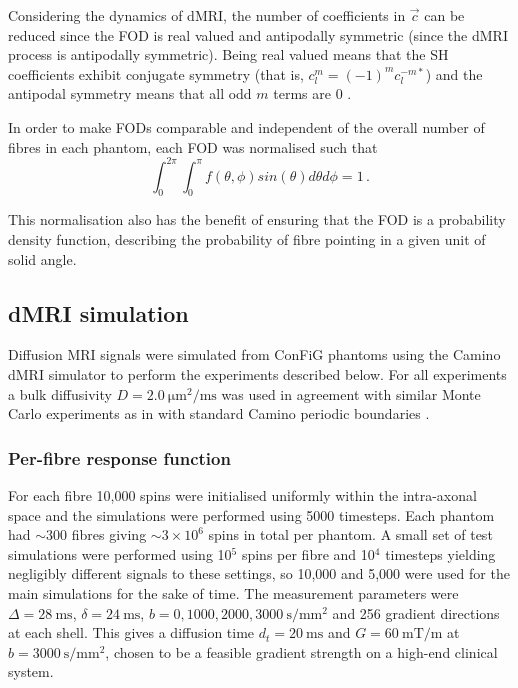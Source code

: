 Considering the dynamics of \ac{dMRI}, the number of coefficients in $\vec{c}$ can be reduced since the \ac{FOD} is real valued and antipodally symmetric (since the \ac{dMRI} process is antipodally symmetric).
Being real valued means that the \ac{SH} coefficients exhibit conjugate symmetry (that is, $c_l^m = (-1)^mc_l^{-m*}$) \cite{Tournier2004,Alexander2002} and the antipodal symmetry means that all odd $m$ terms are 0 \cite{Alexander2002,Tournier2004}.

In order to make \acp{FOD} comparable and independent of the overall number of fibres in each phantom, each \ac{FOD} was normalised such that
\begin{equation}
  \int_0^{2\pi} \int_0^\pi f(\theta, \phi) sin(\theta) d\theta d\phi = 1\,.
  \label{frf:fod_normalisation}
\end{equation}

This normalisation also has the benefit of ensuring that the \ac{FOD} is a probability density function, describing the probability of fibre pointing in a given unit of solid angle. 



\subsection{dMRI simulation}
\label{sec:frf_dMRI_simulation}
Diffusion MRI signals were simulated from ConFiG phantoms using the Camino \ac{dMRI} simulator \cite{Cook2006,Hall2009} to perform the experiments described below. For all experiments a bulk diffusivity $D = \SI{2.0}{\micro\metre\squared\per\milli\second}$ was used in agreement with similar Monte Carlo experiments as in  with standard Camino periodic boundaries \cite{Panagiotaki2010}.


\subsubsection{Per-fibre response function}
For each fibre 10,000 spins were initialised uniformly within the intra-axonal space and the simulations were performed using 5000 timesteps. Each phantom had $\sim 300$ fibres giving $\sim 3\times 10^6$ spins in total per phantom. A small set of test simulations were performed using 10$^5$ spins per fibre and 10$^4$ timesteps yielding negligibly different signals to these settings, so 10,000 and 5,000 were used for the main simulations for the sake of time. The measurement parameters were $\Delta = \SI{28}{\milli\second}$, $\delta = \SI{24}{\milli\second}$, $b = 0,1000,2000,\SI{3000}{\second\per\milli\metre\squared}$ and 256 gradient directions at each shell. This gives a diffusion time $d_t = \SI{20}{\milli\second}$ and $G = \SI{60}{\milli\tesla\per\metre}$ at $b = \SI{3000}{\second\per\milli\metre\squared}$, chosen to be a feasible gradient strength on a high-end clinical system.

